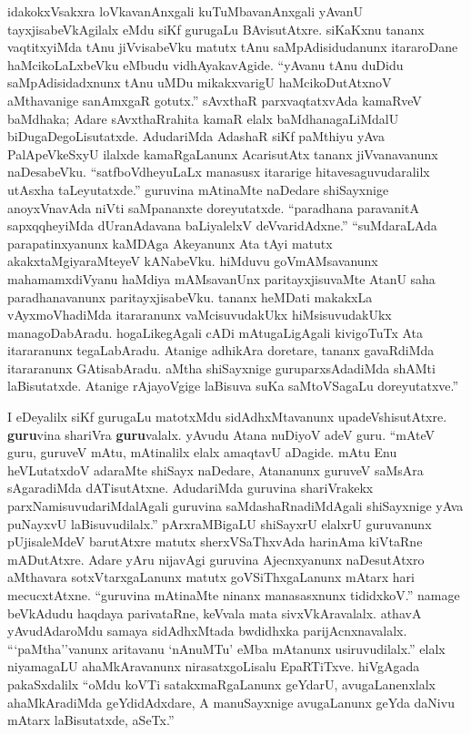 idakokxVsakxra loVkavanAnxgali kuTuMbavanAnxgali yAvanU tayxjisabeVkAgilalx eMdu siKf gurugaLu BAvisutAtxre. siKaKxnu tananx vaqtitxyiMda tAnu jiVvisabeVku matutx tAnu saMpAdisidudanunx itararoDane haMcikoLaLxbeVku eMbudu vidhAyaka\-vAgide. ``yAvanu tAnu duDidu saMpAdisidadxnunx tAnu uMDu mikakxvarigU haMcikoDutAtxnoV aMthavanige sanAmxgaR gotutx.'' sAvxthaR parxvaqtatxvAda kamaRveV baMdhaka; Adare sAvxthaRrahita kamaR elalx baMdhanagaLiMdalU biDugaDegoLisutatxde. AdudariMda AdashaR siKf paMthiyu yAva PalApeVkeSxyU ilalxde kamaRgaLanunx AcarisutAtx tananx jiVvanavanunx naDesabeVku. ``satfboVdheyuLaLx manasusx itararige hitavesaguvudaralilx utAsxha taLeyutatxde.'' guruvina mAtinaMte naDedare shiSayxnige anoyxVnavAda niVti saMpananxte doreyutatxde. ``paradhana paravanitA sapxqqheyiMda dUranAdavana baLiyalelxV deVvaridAdxne.'' ``suMdaraLAda parapatinxyanunx kaMDAga Akeyanunx Ata tAyi matutx akakxtaMgiyaraMteyeV kANabeVku. hiMduvu goVmAMsavanunx mahamamxdiVyanu haMdiya mAMsavanUnx paritayxjisuvaMte AtanU saha paradhanavanunx paritayxjisabeVku. tananx heMDati makakxLa vAyxmoVhadiMda itararanunx vaMcisuvudakUkx hiMsisuvudakUkx managoDabAradu. hogaLikegAgali cADi mAtugaLigAgali kivigoTuTx Ata itararanunx tegaLabAradu. Atanige adhikAra doretare, tananx gavaRdiMda itararanunx GAtisabAradu. aMtha shiSayxnige guruparxsAdadiMda shAMti laBisutatxde. Atanige rAjayoVgige laBisuva suKa saMtoVSagaLu doreyutatxve.''

I eDeyalilx siKf gurugaLu matotxMdu sidAdhxMtavanunx upadeVshisutAtxre. {\bf guru}vina shariVra {\bf guru}valalx. yAvudu Atana nuDiyoV adeV guru. ``mAteV guru, guruveV mAtu, mAtinalilx elalx amaqtavU aDagide. mAtu Enu heVLutatxdoV adaraMte shiSayx naDedare, Atananunx guruveV saMsAra sAgaradiMda dATisutAtxne. AdudariMda guruvina shariVrakekx parxNamisuvudariMdalAgali guruvina saMdashaRnadiMdAgali shiSayxnige yAva puNayxvU laBisuvudilalx.'' pArxraMBigaLU shiSayxrU elalxrU guruvanunx pUjisaleMdeV barutAtxre matutx sherxVSaThxvAda harinAma kiVtaRne mADutAtxre. Adare yAru nijavAgi guruvina Ajecnxyanunx naDesutAtxro aMthavara sotxVtarxgaLanunx matutx goVSiThxgaLanunx mAtarx hari mecucxtAtxne. ``guruvina mAtinaMte ninanx manasasxnunx tididxkoV.'' namage beVkAdudu haqdaya parivataRne, keVvala mata sivxVkAravalalx. athavA yAvudAdaroMdu samaya sidAdhxMtada bwdidhxka parijAcnxnavalalx. ```paMtha''vanunx aritavanu `nAnuMTu' eMba mAtanunx usiruvudilalx.'' elalx niyamagaLU ahaMkAravanunx nirasatxgoLisalu EpaRTiTxve. hiVgAgada pakaSxdalilx ``oMdu koVTi satakxmaRgaLanunx geYdarU, avugaLanenxlalx ahaMkAradiMda geYdidAdxdare, A manuSayxnige avugaLanunx geYda daNivu mAtarx laBisutatxde, aSeTx.''

